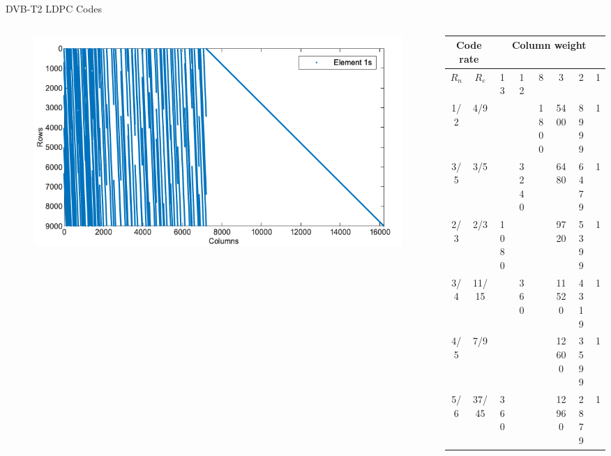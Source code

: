 \documentclass[11pt, aspectratio=169]{beamer}
\begin{document}
\begin{frame}{DVB-T2 LDPC Codes}

\vspace{-1cm}


\begin{columns}
	\begin{column}{0.5\textwidth}
		
		\begin{figure}
			\includegraphics[scale=0.5]{gambarafa/hs(1-2)-2}
			
		\end{figure}
		
	\end{column}
	\begin{column}{0.55\textwidth}  
		\begin{center}
			{\footnotesize
				\begin{table}
							\begin{adjustbox}{width=0.8\textwidth , totalheight=\baselineskip,keepaspectratio}
				\renewcommand{\figurename}{Table}
				\centering 
				\label{table:dvb-t2lite}
				\begin{tabular}{|c|c|c|c|c|c|c|c|}
					\hline
					\multicolumn{2}{|c|}{Code rate} & \multicolumn{6}{c|}{Column weight}    \\ \hline
					$R_n$  & $R_e$  & 13   & 12   & 8    & 3     & 2    & 1 \\ \hline
					1/2           & 4/9             &      &      & 1800 & 5400  & 8999 & 1 \\ \hline
					3/5           & 3/5             &      & 3240 &      & 6480  & 6479 & 1 \\ \hline
					2/3           & 2/3             & 1080 &      &      & 9720  & 5399 & 1 \\ \hline
					3/4           & 11/15           &      & 360  &      & 11520 & 4319 & 1 \\ \hline
					4/5           & 7/9             &      &      &      & 12600 & 3599 & 1 \\ \hline
					5/6           & 37/45           & 360  &      &      & 12960 & 2879 & 1 \\ \hline
				\end{tabular}
				\end{adjustbox}
				

\end{table}}
\end{center}
\end{column}
\end{columns}
\end{frame}
\end{document}
